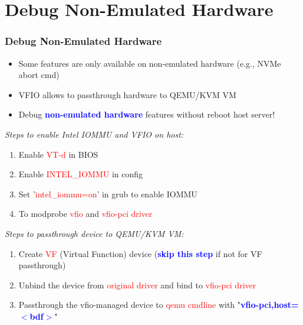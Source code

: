 \documentclass[aspectratio=169]{beamer}
\begin{document}
\section{Debug Non-Emulated Hardware}
\begin{frame}
\frametitle{Debug Non-Emulated Hardware}
\begin{itemize}
\item Some features are only available on non-emulated hardware (e.g., NVMe abort cmd)
\item VFIO allows to passthrough hardware to QEMU/KVM VM
\item Debug \textbf{\textcolor{blue}{non-emulated hardware}} features without reboot host server!
\end{itemize}
\begin{block}{}
\textit{Steps to enable Intel IOMMU and VFIO on host:}
\begin{enumerate}
\item Enable \textcolor{red}{VT-d} in BIOS
\item Enable \textcolor{red}{INTEL\_IOMMU} in config
\item Set '\textcolor{red}{intel\_iommu=on}' in grub to enable IOMMU
\item To modprobe \textcolor{red}{vfio} and \textcolor{red}{vfio-pci driver}
\end{enumerate}

\vspace{2 mm}

\textit{Steps to passthrough device to QEMU/KVM VM:}
\begin{enumerate}
\item Create \textcolor{red}{VF} (Virtual Function) device (\textbf{\textcolor{blue}{skip this step}} if not for VF passthrough)
\item Unbind the device from \textcolor{red}{original driver} and bind to \textcolor{red}{vfio-pci driver}
\item Passthrough the vfio-managed device to \textcolor{red}{qemu cmdline} with "\textbf{\textcolor{blue}{vfio-pci,host=$<$bdf$>$}}"
\end{enumerate}
\end{block}
\end{frame}

\end{document}
